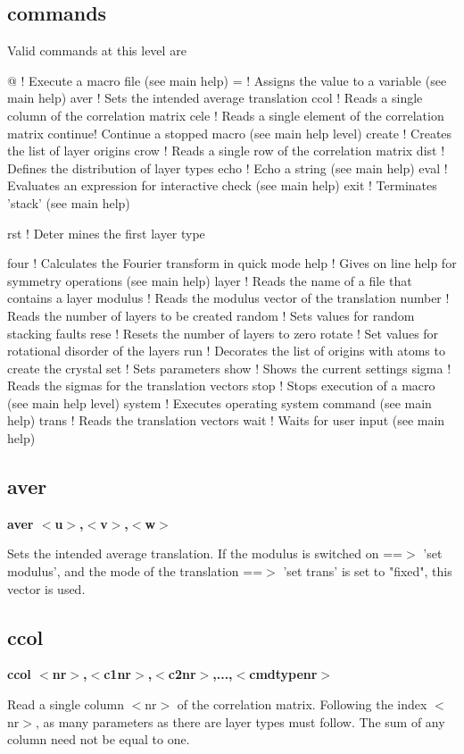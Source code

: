 \subsection*{commands}
Valid commands at this level are 
\par
\begin{MacVerbatim}
@       ! Execute a macro file (see main help)
=       ! Assigns the value to a variable (see main help)
aver    ! Sets the intended average translation
ccol    ! Reads a single column of the correlation matrix
cele    ! Reads a single element of the correlation matrix
continue! Continue a stopped macro (see main help level)
create  ! Creates the list of layer origins
crow    ! Reads a single row of the correlation matrix
dist    ! Defines the distribution of layer types
echo    ! Echo a string (see main help)
eval    ! Evaluates an expression for interactive check (see main help)
exit    ! Terminates 'stack' (see main help)
\end{MacVerbatim}
rst     ! Deter mines the first layer type 
\begin{MacVerbatim}
four    ! Calculates the Fourier transform in quick mode
help    ! Gives on line help for symmetry operations (see main help)
layer   ! Reads the name of a file that contains a layer
modulus ! Reads the modulus vector of the translation
number  ! Reads the number of layers to be created
random  ! Sets values for random stacking faults
rese    ! Resets the number of layers to zero
rotate  ! Set values for rotational disorder of the layers
run     ! Decorates the list of origins with atoms to create the crystal
set     ! Sets parameters
show    ! Shows the current settings
sigma   ! Reads the sigmas for the translation vectors
stop    ! Stops execution of a macro (see main help level)
system  ! Executes operating system command (see main help)
trans   ! Reads the translation vectors
wait    ! Waits for user input (see main help)
\end{MacVerbatim}
\subsection*{aver}
{\bf aver $ <$u$> $,$ <$v$> $,$ <$w$> $ \par }
\par
\vspace{3pt}
Sets the intended average translation. 
If the modulus is switched on ==$> $ 'set modulus', and the mode of the 
translation ==$> $ 'set trans' is set to "fixed", this vector is used. 
\subsection*{ccol}
{\bf ccol $ <$nr$> $,$ <$c1nr$> $,$ <$c2nr$> $,...,$ <$cmdtypenr$> $ \par }
\par
\vspace{3pt}
Read a single column $ <$nr$> $ of the correlation matrix. Following the 
index $ <$nr$> $, as many parameters as there are layer types must follow. 
The sum of any column need not be equal to one. 
